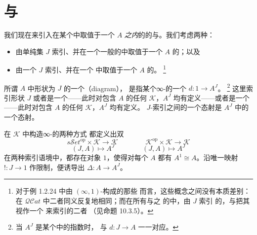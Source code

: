 \providecommand{\Fun}{\operatorname{Fun}}
\providecommand{\Cat}{\mathcal{C}at}
\providecommand{\QCat}{\mathcal{Q}\mathcal{C}at}
\providecommand{\sSet}{s\mathcal{S}et}
\providecommand{\qcOne}{\mathbf{1}}   %
\providecommand{\colim}{\operatorname{colim}\nolimits}
\providecommand{\qcTwo}{\mathbf{2}}   %
\providecommand{\CospanShape}{\lrcorner}   %

\section{\trLimit{}与\trColimit}\label{sec:limits-and-colimits}

我们现在来引入在某个\trInfinityCosmos{}中取值于一个\trInfinityCategory{} $A$
\emph{之内}的\trDiagram{}的\trLimit{}与\trColimit{}。我们考虑两种\trDiagram{}：
\begin{itemize}
\item 由单纯集 $J$ 索引、并在一个一般的\trInfinityCosmos{}中取值于一个%
\trInfinityCategory{} $A$ 的\trDiagram{}；以及
\item 由一个\trInfinityCategory{} $J$ 索引、并在一个\trCartesianClosed{}%
\trInfinityCosmos{}中取值于一个\trInfinityCategory{} $A$ 的\trDiagram{}。%
\footnote{对于例 1.2.24 中由 $(\infty,1)$-\trCategory{}构成的那些\trInfinityCosmos{}%
而言，这些概念之间没有本质差别：在 $\QCat$ 中二者同义反复地相同；而在所有与之%
\trBiequivalence{}的\trInfinityCosmos{}中，由\trInfinityCategory{} $J$ 索引%
\trDiagram{}的\trInfinityCategory{}，与把其\trUnderlyingQuasiCategory{}视作一个%
\trSimplicialSet{}来索引\trDiagram{}的\trInfinityCategory{}二者\trEquivalence{}
（见命题 10.3.5）。}
\end{itemize}

\begin{definition}[图表]\label{def:diagram}
所谓\trInfinityCategory{} $A$ 中形状为 $J$ 的一个\textbf{\trDiagram}（diagram），
是指某个\trDiagram{}∞-\trCategory{}的一个\trElement{} $d\colon 1\to A^J$。%
\footnote{当 $A^J$ 是某个\trCartesianClosed{}\trInfinityCosmos{}中的指数时，
\trDiagram{}与\trFunctor{} $d\colon J\to A$ 一一对应。}
这里索引形状 $J$ 或者是一个\trSimplicialSet——此时对包含 $A$ 的任何%
\trInfinityCosmos{} $\mathcal{K}$，$A^J$ 均有定义——或者是一个%
\trInfinityCategory——此时对包含 $A$ 的任何\trCartesianClosed{}%
\trInfinityCosmos{} $\mathcal{K}$，$A^J$ 均有定义。
$J$-索引\trDiagram{}之间的一个态射是\trInfinityCategory{} $A^J$ 中的
一个态射。
\end{definition}

在\trInfinityCosmos{} $\mathcal{K}$ 中构造\trDiagram{}∞-\trCategory{}的两种方式
都定义出\trSimplicial{}双\trFunctor
\begin{equation*}
\sSet^{\mathrm{op}}\times\mathcal{K}\longrightarrow\mathcal{K}
\qquad\qquad
\mathcal{K}^{\mathrm{op}}\times\mathcal{K}\longrightarrow\mathcal{K}
\end{equation*}
\begin{equation*}
(J,A)\longmapsto A^J
\qquad\qquad
(J,A)\longmapsto A^J
\end{equation*}
在两种索引语境中，都存在\trTerminal{}对象 $1$，使得对每个\trInfinityCategory{} $A$
都有 $A^1\cong A$。沿唯一映射 $!\colon J\to 1$ 作限制，便诱导出%
\trConstantFunctor{} $\Delta\colon A\to A^J$。

